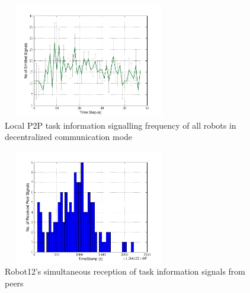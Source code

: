 \documentclass{ifacconf}
\begin{document}
\begin{figure}
\begin{center}
\includegraphics[width=7.5cm,height=5cm]{./images/Local-500cm-SignalingFreqStat}    %
\caption{Local P2P task information signalling frequency of all robots in decentralized communication mode} 
\label{fig:local-freq}
\end{center}
\end{figure}
\begin{figure}
\begin{center}
\includegraphics[width=7.5cm,height=5cm]{./images/Robot12-17feb-3-LocalSignals}
\caption{Robot12's simultaneous reception of task information signals from peers} 
\label{fig:robot-freq}
\end{center}
\end{figure}
\end{document}
